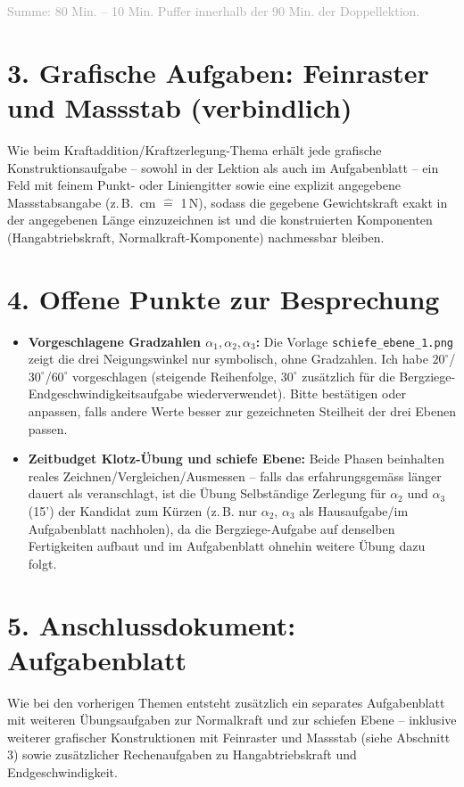 \documentclass[11pt,a4paper]{article}
\begin{document}
\textcolor{darkgray}{\small Summe: 80 Min. -- 10 Min. Puffer innerhalb der
90 Min. der Doppellektion.}

\section*{3. Grafische Aufgaben: Feinraster und Massstab (verbindlich)}

Wie beim Kraftaddition/Kraftzerlegung-Thema erhält jede grafische
Konstruktionsaufgabe -- sowohl in der Lektion als auch im Aufgabenblatt --
ein Feld mit feinem Punkt- oder Liniengitter sowie eine explizit
angegebene Massstabsangabe (z.\,B. \,cm $\hat=$ 1\,N\grqq{}), sodass
die gegebene Gewichtskraft exakt in der angegebenen Länge einzuzeichnen
ist und die konstruierten Komponenten (Hangabtriebskraft,
Normalkraft-Komponente) nachmessbar bleiben.

\section*{4. Offene Punkte zur Besprechung}

\begin{itemize}[leftmargin=1.2cm,itemsep=0.4em]
  \item \textbf{Vorgeschlagene Gradzahlen $\alpha_1,\alpha_2,\alpha_3$:}
  Die Vorlage \texttt{schiefe\_ebene\_1.png} zeigt die drei Neigungswinkel
  nur symbolisch, ohne Gradzahlen. Ich habe $20^\circ$/$30^\circ$/$60^\circ$
  vorgeschlagen (steigende Reihenfolge, $30^\circ$ zusätzlich für die
  Bergziege-Endgeschwindigkeitsaufgabe wiederverwendet). Bitte bestätigen
  oder anpassen, falls andere Werte besser zur gezeichneten Steilheit der
  drei Ebenen passen.
  \item \textbf{Zeitbudget Klotz-Übung und schiefe Ebene:} Beide Phasen
  beinhalten reales Zeichnen/Vergleichen/Ausmessen -- falls das
  erfahrungsgemäss länger dauert als veranschlagt, ist die Übung
  \glqq Selbständige Zerlegung für $\alpha_2$ und $\alpha_3$\grqq{} (15')
  der Kandidat zum Kürzen (z.\,B. nur $\alpha_2$, $\alpha_3$ als
  Hausaufgabe/im Aufgabenblatt nachholen), da die Bergziege-Aufgabe auf
  denselben Fertigkeiten aufbaut und im Aufgabenblatt ohnehin weitere
  Übung dazu folgt.
\end{itemize}

\section*{5. Anschlussdokument: Aufgabenblatt}

Wie bei den vorherigen Themen entsteht zusätzlich ein separates
Aufgabenblatt mit weiteren Übungsaufgaben zur Normalkraft und zur schiefen
Ebene -- inklusive weiterer grafischer Konstruktionen mit Feinraster und
Massstab (siehe Abschnitt 3) sowie zusätzlicher Rechenaufgaben zu
Hangabtriebskraft und Endgeschwindigkeit.
\end{document}
